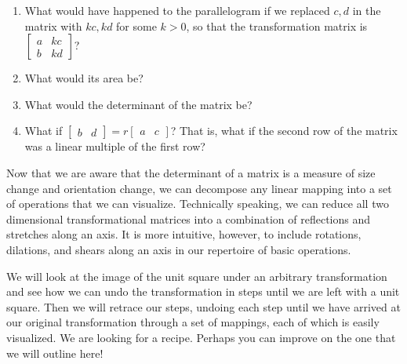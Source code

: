\documentclass[../gatm.tex]{subfiles}
\begin{document}
\begin{enumerate}
\begin{enumerate}
\begin{enumerate}
\item What would have happened to the parallelogram if we replaced $c,d$ in the matrix with $kc,kd$ for some $k>0$, so that the transformation matrix is $\left[\begin{array}{cc} a & kc \\ b & kd \end{array}\right]$?
\item What would its area be?
\item What would the determinant of the matrix be?
\item What if $\left[\begin{array}{cc}b & d \end{array}\right]=r\left[\begin{array}{cc}a & c \end{array}\right]$? That is, what if the second row of the matrix was a linear multiple of the first row?
\end{enumerate}
\end{enumerate}
\setcounter{problem_i}{\value{enumi}}
\end{enumerate}

\noindent Now that we are aware that the determinant of a matrix is a measure of size change and orientation change, we can decompose any linear mapping into a set of operations that we can visualize. Technically speaking, we can reduce all two dimensional transformational matrices into a combination of reflections and stretches along an axis. It is more intuitive, however, to include rotations, dilations, and shears along an axis in our repertoire of basic operations.

We will look at the image of the unit square under an arbitrary transformation and see how we can undo the transformation in steps until we are left with a unit square. Then we will retrace our steps, undoing each step until we have arrived at our original transformation through a set of mappings, each of which is easily visualized. We are looking for a recipe. Perhaps you can improve on the one that we will outline here! %

\end{document}
